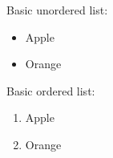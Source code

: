 \noindent Basic unordered list:
\par
\begin{itemize}[nosep]  %
  \item Apple
  \item Orange 
\end{itemize}

\noindent Basic ordered list:
\par
\begin{enumerate}
  \item Apple
  \item Orange 
\end{enumerate}